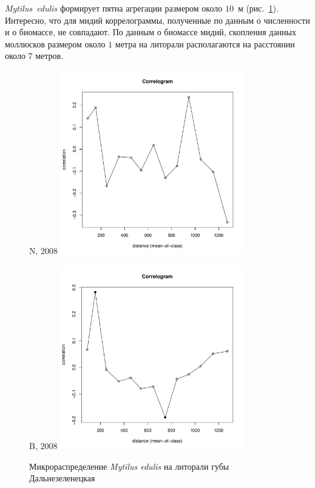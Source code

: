 {\it Mytilus~edulis} формирует пятна агрегации размером около $10$~м (рис.~\ref{ris:moransI_Plyazh_Mytilus}). 
Интересно, что для мидий коррелограммы, полученные по данным о численности и о биомассе, не совпадают. 
По данным о биомассе мидий, скопления данных моллюсков размером около $1$ метра на литорали располагаются на расстоянии около $7$ метров.

	\begin{figure}[h]
	\begin{minipage}[b]{.5\linewidth}
	\begin{center}
	{\small N, $2008$}
		\includegraphics[width=80mm]{../Barenc_Sea/distribution_Moran/Plyazh082_moran_N_Mytilus_edulis_.pdf}
	\end{center}
	\end{minipage}
	\hfil %
	\begin{minipage}[b]{.5\linewidth}
	\begin{center}
	{\small B, $2008$}
		\includegraphics[width=80mm]{../Barenc_Sea/distribution_Moran/Plyazh082_moran_B_Mytilus_edulis_.pdf}
	\end{center}
	\end{minipage}


	\caption{Микрораспределение {\it Mytilus edulis} на литорали губы Дальнезеленецкая}
	\label{ris:moransI_Plyazh_Mytilus}
	\end{figure}

